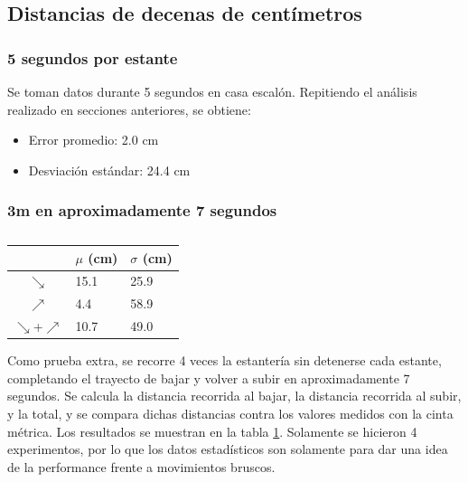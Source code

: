 \documentclass[main]{subfiles}
\begin{document}
\subsection{Distancias de decenas de cent\'imetros}

\subsubsection{5 segundos por estante}

Se toman datos durante 5 segundos en casa escal\'on. Repitiendo el an\'alisis realizado en secciones anteriores, se obtiene:
\begin{itemize}
\item Error promedio: 2.0 cm
\item Desviaci\'on est\'andar: 24.4 cm
\end{itemize}

\subsubsection{3m en aproximadamente 7 segundos}

\begin{table}
\vspace{-105pt}
\hspace{10pt}
\begin{tabular}{c|p{40pt}|p{40pt}|} 
\cline{2-3}
  & $\mu$ (cm) & $\sigma$ (cm)\\ \hline
\multicolumn{1}{|c|}{$\searrow$} & 15.1 & 25.9 \\ \hline
\multicolumn{1}{|c|}{$\nearrow$} & 4.4 &  58.9 \\ \hline
\multicolumn{1}{|c|}{$\searrow$+$\nearrow$} & 10.7 & 49.0 \\ \hline
\end{tabular}
\caption{}
\label{tab:ruido-rms}
\vspace{-15pt}
\end{table}

Como prueba extra, se recorre 4 veces la estanter\'ia sin detenerse cada estante, completando el trayecto de bajar y volver a subir en aproximadamente 7 segundos. Se calcula la distancia recorrida al bajar, la distancia recorrida al subir, y la total, y se compara dichas distancias contra los valores medidos con la cinta m\'etrica. Los resultados se muestran en la tabla \ref{tab:ruido-rms}. Solamente se hicieron 4 experimentos, por lo que los datos estad\'isticos son solamente para dar una idea de la performance frente a movimientos bruscos.
\end{document}
